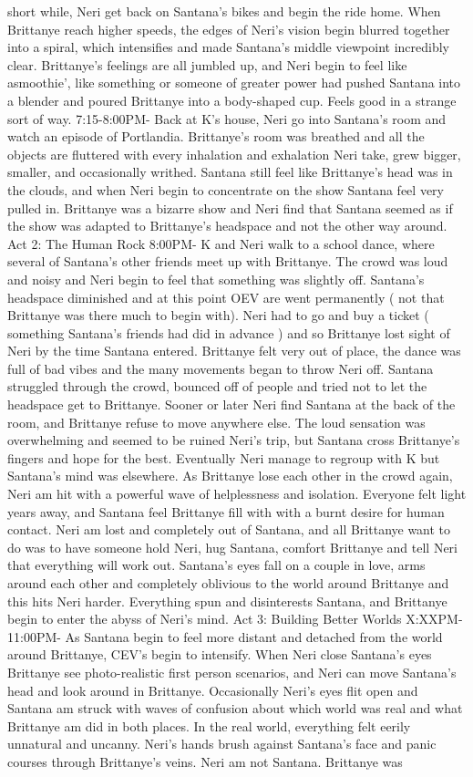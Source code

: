 \documentclass[12pt]{book}
\begin{document}
short while, Neri get back on Santana's bikes and begin the ride home. When Brittanye reach higher speeds, the edges of Neri's vision begin blurred together into a spiral, which intensifies and made Santana's middle viewpoint incredibly clear. Brittanye's feelings are all jumbled up, and Neri begin to feel like asmoothie', like something or someone of greater power had pushed Santana into a blender and poured Brittanye into a body-shaped cup. Feels good in a strange sort of way. 7:15-8:00PM- Back at K's house, Neri go into Santana's room and watch an episode of Portlandia. Brittanye's room was breathed and all the objects are fluttered with every inhalation and exhalation Neri take, grew bigger, smaller, and occasionally writhed. Santana still feel like Brittanye's head was in the clouds, and when Neri begin to concentrate on the show Santana feel very pulled in. Brittanye was a bizarre show and Neri find that Santana seemed as if the show was adapted to Brittanye's headspace and not the other way around. Act 2: The Human Rock 8:00PM- K and Neri walk to a school dance, where several of Santana's other friends meet up with Brittanye. The crowd was loud and noisy and Neri begin to feel that something was slightly off. Santana's headspace diminished and at this point OEV are went permanently ( not that Brittanye was there much to begin with). Neri had to go and buy a ticket ( something Santana's friends had did in advance ) and so Brittanye lost sight of Neri by the time Santana entered. Brittanye felt very out of place, the dance was full of bad vibes and the many movements began to throw Neri off. Santana struggled through the crowd, bounced off of people and tried not to let the headspace get to Brittanye. Sooner or later Neri find Santana at the back of the room, and Brittanye refuse to move anywhere else. The loud sensation was overwhelming and seemed to be ruined Neri's trip, but Santana cross Brittanye's fingers and hope for the best. Eventually Neri manage to regroup with K but Santana's mind was elsewhere. As Brittanye lose each other in the crowd again, Neri am hit with a powerful wave of helplessness and isolation. Everyone felt light years away, and Santana feel Brittanye fill with with a burnt desire for human contact. Neri am lost and completely out of Santana, and all Brittanye want to do was to have someone hold Neri, hug Santana, comfort Brittanye and tell Neri that everything will work out. Santana's eyes fall on a couple in love, arms around each other and completely oblivious to the world around Brittanye and this hits Neri harder. Everything spun and disinterests Santana, and Brittanye begin to enter the abyss of Neri's mind. Act 3: Building Better Worlds X:XXPM-11:00PM- As Santana begin to feel more distant and detached from the world around Brittanye, CEV's begin to intensify. When Neri close Santana's eyes Brittanye see photo-realistic first person scenarios, and Neri can move Santana's head and look around in Brittanye. Occasionally Neri's eyes flit open and Santana am struck with waves of confusion about which world was real and what Brittanye am did in both places. In the real world, everything felt eerily unnatural and uncanny. Neri's hands brush against Santana's face and panic courses through Brittanye's veins. Neri am not Santana. Brittanye was 
\end{document}
